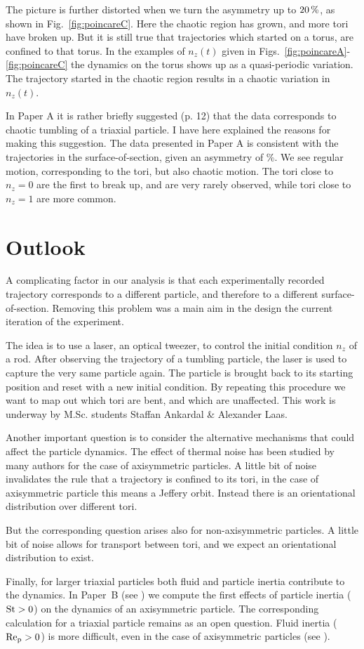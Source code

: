 \documentclass[thesis.tex]{subfiles}
\begin{document}
The picture is further distorted when we turn the asymmetry up to $\unit[20]{\%}$, as shown in Fig.~\ref{fig:poincareC}. Here the chaotic region has grown, and more tori have broken up. But it is still true that trajectories which started on a torus, are confined to that torus. In the examples of $n_z(t)$ given in Figs.~\ref{fig:poincareA}-\ref{fig:poincareC} the dynamics on the torus shows up as a quasi-periodic variation. The trajectory started in the chaotic region results in a chaotic variation in $n_z(t)$.

In Paper A it is rather briefly suggested (p. 12) that the data corresponds to chaotic tumbling of a triaxial particle. I have here explained the reasons for making this suggestion. The data presented in Paper A is consistent with the trajectories in the surface-of-section, given an asymmetry of \unit[10-30]{\%}. We see regular motion, corresponding to the tori, but also chaotic motion. The tori close to $n_z=0$ are the first to break up, and are very rarely observed, while tori close to $n_z=1$ are more common. 


\section{Outlook}

A complicating factor in our analysis is that each experimentally recorded trajectory corresponds to a different particle, and therefore to a different surface-of-section. Removing this problem was a main aim in the design the current iteration of the experiment.

The idea is to use a laser, an optical tweezer, to control the initial condition $n_z$ of a rod. After observing the trajectory of a tumbling particle, the laser is used to capture the very same particle again. The particle is brought back to its starting position and reset with a new initial condition. By repeating this procedure we want to map out which tori are bent, and which are unaffected. This work is underway by M.Sc. students Staffan Ankardal \& Alexander Laas.

Another important question is to consider the alternative mechanisms that could affect the particle dynamics. The effect of thermal noise has been studied by many authors for the case of axisymmetric particles. A little bit of noise invalidates the rule that a trajectory is confined to its tori, in the case of axisymmetric particle this means a Jeffery orbit. Instead there is an orientational distribution over different tori.

But the corresponding question arises also for non-axisymmetric particles. A little bit of noise allows for transport between tori, and we expect an orientational distribution to exist.

Finally, for larger triaxial particles both fluid and particle inertia contribute to the dynamics. In Paper~B (see ) we compute the first effects of particle inertia ($\mbox{St}>0$) on the dynamics of an axisymmetric particle. The corresponding calculation for a triaxial particle remains as an open question. Fluid inertia ($\mbox{Re}_{\mathrm p} > 0$) is more difficult, even in the case of axisymmetric particles (see ).
\end{document}
